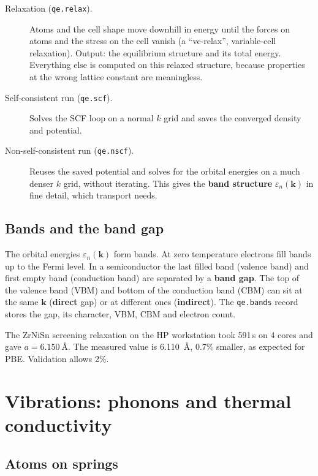 \documentclass[11pt,a4paper]{report}
\newcommand{\code}[1]{\texttt{#1}}
\begin{document}
\begin{description}
\item[Relaxation (\code{qe.relax}).] Atoms and the cell shape move downhill in energy until the
  forces on atoms and the stress on the cell vanish (a ``vc-relax'', variable-cell relaxation).
  Output: the equilibrium structure and its total energy. Everything else is computed on this
  relaxed structure, because properties at the wrong lattice constant are meaningless.
\item[Self-consistent run (\code{qe.scf}).] Solves the SCF loop on a normal $k$ grid and saves the
  converged density and potential.
\item[Non-self-consistent run (\code{qe.nscf}).] Reuses the saved potential and solves for the
  orbital energies on a much denser $k$ grid, without iterating. This gives the
  \textbf{band structure} $\varepsilon_n(\mathbf k)$ in fine detail, which transport needs.
\end{description}

\section{Bands and the band gap}

The orbital energies $\varepsilon_n(\mathbf k)$ form bands. At zero temperature electrons fill
bands up to the Fermi level. In a semiconductor the last filled band (valence band) and first
empty band (conduction band) are separated by a \textbf{band gap}. The top of the valence band
(VBM) and bottom of the conduction band (CBM) can sit at the same $\mathbf k$ (\textbf{direct}
gap) or at different ones (\textbf{indirect}). The \code{qe.bands} record stores the gap, its
character, VBM, CBM and electron count.

\begin{inff}
The ZrNiSn screening relaxation on the HP workstation took 591\,s on 4 cores and gave
$a=\SI{6.150}{\angstrom}$. The measured value is \SI{6.110}{\angstrom}, 0.7\% smaller, as
expected for PBE. Validation allows 2\%.
\end{inff}

\chapter{Vibrations: phonons and thermal conductivity}

\section{Atoms on springs}
\end{document}
